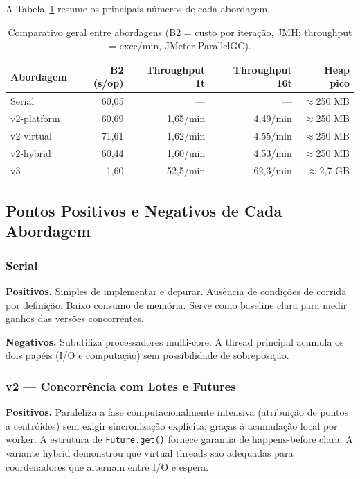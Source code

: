 A Tabela~\ref{tab:comparativo-geral} resume os principais números de cada abordagem.

\begin{table}[H]
\centering
\begin{tabular}{lrrrr}
\hline
\textbf{Abordagem} & \textbf{B2 (s/op)} & \textbf{Throughput 1t} & \textbf{Throughput 16t} & \textbf{Heap pico} \\
\hline
Serial      & 60{,}05 &     ---    &     ---    & $\approx$250 MB \\
v2-platform & 60{,}69 & 1{,}65/min & 4{,}49/min & $\approx$250 MB \\
v2-virtual  & 71{,}61 & 1{,}62/min & 4{,}55/min & $\approx$250 MB \\
v2-hybrid   & 60{,}44 & 1{,}60/min & 4{,}53/min & $\approx$250 MB \\
v3          &  1{,}60 & 52{,}5/min & 62{,}3/min & $\approx$2{,}7 GB \\
\hline
\end{tabular}
\caption{Comparativo geral entre abordagens (B2 = custo por iteração, JMH; throughput = exec/min, JMeter ParallelGC).}
\label{tab:comparativo-geral}
\end{table}

\subsection{Pontos Positivos e Negativos de Cada Abordagem}

\subsubsection*{Serial}

\textbf{Positivos.}
Simples de implementar e depurar. Ausência de condições de corrida por definição.
Baixo consumo de memória. Serve como baseline clara para medir ganhos das versões
concorrentes.

\textbf{Negativos.}
Subutiliza processadores multi-core. A thread principal acumula os dois papéis
(I/O e computação) sem possibilidade de sobreposição.

\subsubsection*{v2 --- Concorrência com Lotes e Futures}

\textbf{Positivos.}
Paraleliza a fase computacionalmente intensiva (atribuição de pontos a centróides)
sem exigir sincronização explícita, graças à acumulação local por worker. A
estrutura de \texttt{Future.get()} fornece garantia de happens-before clara. A
variante hybrid demonstrou que virtual threads são adequadas para coordenadores
que alternam entre I/O e espera.


